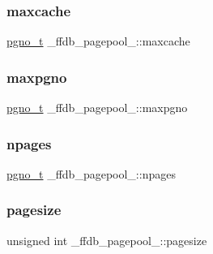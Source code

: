 \mbox{\label{struct__ffdb__pagepool___ae5bd28d10237990065e0d2ea509bcdcd}} 
\subsubsection{\texorpdfstring{maxcache}{maxcache}}
{\footnotesize\ttfamily \mbox{\hyperlink{other__libs_2filedb_2filehash_2ffdb__db_8h_a000813331643d38481142bcce7de1501}{pgno\+\_\+t}} \+\_\+ffdb\+\_\+pagepool\+\_\+\+::maxcache}

\mbox{\label{struct__ffdb__pagepool___a2f0ea8a42e82177f171e049c43a36719}} 
\subsubsection{\texorpdfstring{maxpgno}{maxpgno}}
{\footnotesize\ttfamily \mbox{\hyperlink{other__libs_2filedb_2filehash_2ffdb__db_8h_a000813331643d38481142bcce7de1501}{pgno\+\_\+t}} \+\_\+ffdb\+\_\+pagepool\+\_\+\+::maxpgno}

\mbox{\label{struct__ffdb__pagepool___a03e1704e405a74b8c1d78e60cb7a502d}} 
\subsubsection{\texorpdfstring{npages}{npages}}
{\footnotesize\ttfamily \mbox{\hyperlink{other__libs_2filedb_2filehash_2ffdb__db_8h_a000813331643d38481142bcce7de1501}{pgno\+\_\+t}} \+\_\+ffdb\+\_\+pagepool\+\_\+\+::npages}

\mbox{\label{struct__ffdb__pagepool___a890e1c5c8749a2017bd030e3cac3b10c}} 
\subsubsection{\texorpdfstring{pagesize}{pagesize}}
{\footnotesize\ttfamily unsigned int \+\_\+ffdb\+\_\+pagepool\+\_\+\+::pagesize}


